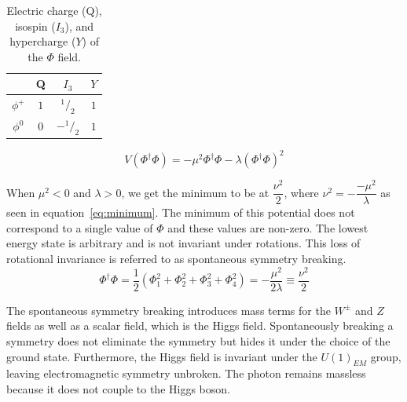 \begin{center}
\begin{table}[htb]
\caption{\small   Electric charge (Q), isospin ($I_{3}$), and hypercharge ($Y$) of the $\Phi$ field.
}
\begin{center}
\begin{tabular}{ c c c c }
\hline     & Q    & $I_{3}$ & $Y$ \\ \hline \hline
$\phi^+$   & $1$  & $^1/_2$  & $1$ \\
$\phi^0$   & $0$  & $-^1/_2$ & $1$ \\ \hline
\hline
\end{tabular}
\end{center}
\label{tab:phi_QuantumNumbers}
\end{table}

\end{center}

\begin{equation} V(\Phi^{\dagger} \Phi) = -\mu^2 \Phi^{\dagger} \Phi - \lambda (\Phi^{\dagger} \Phi)^2 \label{eq:potential}\end{equation}

When $\mu^2 < 0$ and $\lambda > 0$, we get the minimum to be at $\dfrac{\nu^2}{2}$, where $\nu^2 = -\dfrac{-\mu^2}{\lambda}$ as seen in equation~\ref{eq:minimum}.  The minimum of this potential does not correspond to a single value of $\Phi$ and these values are non-zero. The lowest energy state is arbitrary and is not invariant under rotations.  This loss of rotational invariance is referred to as spontaneous symmetry breaking.  
\begin{equation} \Phi^{\dagger} \Phi = \dfrac{1}{2} ( \Phi^2_1 + \Phi^2_2 + \Phi^2_3 + \Phi^2_4) = -\dfrac{\mu^2}{2\lambda} \equiv \dfrac{\nu^2}{2} \label{eq:minimum}\end{equation}

The spontaneous symmetry breaking introduces mass terms for the $W^{\pm}$ and $Z$ fields as well as a scalar field, which is the Higgs field. Spontaneously breaking a symmetry does not eliminate the symmetry but hides it under the choice of the ground state.  Furthermore, the Higgs field is invariant under the $U(1)_{EM}$ group, leaving electromagnetic symmetry unbroken. The photon remains massless because it does not couple to the Higgs boson.

